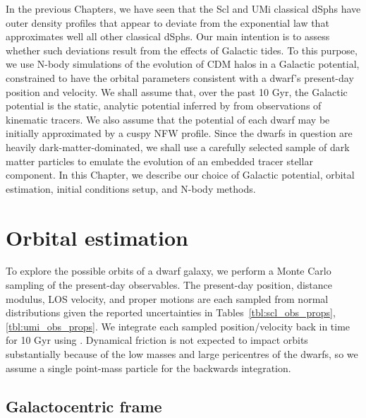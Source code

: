 In the previous Chapters, we have seen that the Scl and UMi classical
dSphs have outer density profiles that appear to deviate from the
exponential law that approximates well all other classical dSphs. Our
main intention is to assess whether such deviations result from the
effects of Galactic tides. To this purpose, we use N-body simulations of
the evolution of CDM halos in a Galactic potential, constrained to have
the orbital parameters consistent with a dwarf's present-day position
and velocity. We shall assume that, over the past 10 Gyr, the Galactic
potential is the static, analytic potential inferred by
\citet{mcmillan2011} from observations of kinematic tracers. We also
assume that the potential of each dwarf may be initially approximated by
a cuspy NFW profile. Since the dwarfs in question are heavily
dark-matter-dominated, we shall use a carefully selected sample of dark
matter particles to emulate the evolution of an embedded tracer stellar
component. In this Chapter, we describe our choice of Galactic
potential, orbital estimation, initial conditions setup, and N-body
methods.

\section{Orbital estimation}\label{sec:orbital_estimation}

To explore the possible orbits of a dwarf galaxy, we perform a Monte
Carlo sampling of the present-day observables. The present-day position,
distance modulus, LOS velocity, and proper motions are each sampled from
normal distributions given the reported uncertainties in
Tables~\ref{tbl:scl_obs_props}, \ref{tbl:umi_obs_props}. We integrate
each sampled position/velocity back in time for 10 Gyr using \agama{}
\citep{agama}. Dynamical friction is not expected to impact orbits
substantially because of the low masses and large pericentres of the
dwarfs, so we assume a single point-mass particle for the backwards
integration.

\subsection{Galactocentric frame}\label{galactocentric-frame}

